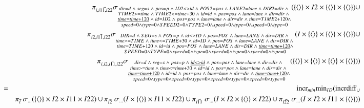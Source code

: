 \begin{eqnarray*}
&& \pi_{\vec{i, i11, i22}}\sigma_{\substack{dir = d \;\wedge\; seg = s \;\wedge\; pos = p \;\wedge\; ID2 <> id \;\wedge\; POS2 = pos \;\wedge\; LANE2 = lane \;\wedge\; DIR2 = dir \;\wedge\; \\ TIME2 >= time \;\wedge\; TIME2 <= time + 30 \;\wedge\; id = id \;\wedge\; pos = pos \;\wedge\;  lane = lane \;\wedge\; dir =dir \;\wedge\; \\\underline {time = time + 120} \;\wedge\; id = ID2 \;\wedge\; pos = pos \;\wedge\;  lane = lane \;\wedge\; dir = dir \;\wedge\; time = TIME2 + 120 \wedge \\speed = 0 \wedge type = 0 \wedge SPEED2 = 0 \wedge TYPE2 = 0 \wedge  speed = 0 \wedge type = 0 \wedge speed = 0 \wedge type =0 }}( \{{\langle\rangle} \} \times I2 \times \{{\langle\rangle} \} \times \{{\langle\rangle} \} ) \cup \\
&& \pi_{\vec{i2, i11, i22}}\sigma_{\substack{DIR = d \;\wedge\; SEG = s \;\wedge\; POS = p \;\wedge\; id <> ID \;\wedge\; pos = POS \;\wedge\; lane = LANE \;\wedge\; dir = DIR \;\wedge\; \\ time >= TIME \;\wedge\; time <= TIME + 30 \;\wedge\; id = ID \;\wedge\; pos = POS \;\wedge\;  lane = LANE \;\wedge\; dir=DIR \;\wedge\; \\time = TIME + 120 \;\wedge\; id = id \;\wedge\; pos = POS \;\wedge\;  lane = LANE \;\wedge\; dir = DIR \;\wedge\; \underline { time = time + 120} \wedge \\SPEED = 0 \wedge TYPE = 0 \wedge speed = 0 \wedge type = 0 \wedge  speed = 0 \wedge type = 0 \wedge speed = 0 \wedge type =0 }}(I \times \{{\langle\rangle} \} \times \{{\langle\rangle} \} \times  \{{\langle\rangle} \}) \cup \\
&& \pi_{\vec{i, i2, i11, i22}}\sigma_{\substack{dir = d \;\wedge\; seg = s \;\wedge\; pos = p \;\wedge\; \underline {id <> id} \;\wedge\; pos= pos \;\wedge\; lane = lane \;\wedge\; dir = dir \;\wedge\; \\ time >= time \;\wedge\; time <= time + 30 \;\wedge\; id = id \;\wedge\; pos = pos \;\wedge\;  lane = lane \;\wedge\; dir=dir \;\wedge\; \\\underline {time = time + 120} \;\wedge\; id = id \;\wedge\; pos = pos \;\wedge\;  lane = lane \;\wedge\; dir = dir \;\wedge\; \underline {time = time + 120} \wedge \\speed = 0 \wedge type = 0 \wedge speed = 0 \wedge type = 0 \wedge  speed = 0 \wedge type = 0 \wedge speed = 0 \wedge type =0 }}( \{{\langle\rangle} \} \times \{{\langle\rangle} \} \times \{{\langle\rangle} \} \times \{{\langle\rangle} \} )) \\
&=& \mathrm{incr}_{min} \mathrm{min}_{ID} (\mathrm{incrdiff}_{\cup} \\
&& \pi_{\vec{i}} \;\sigma_{\dots}(  \{{\langle\rangle} \} \times I2 \times I11 \times I22) \cup 
\pi_{\vec{i2}} \;\sigma_{\dots}(I \times \{{\langle\rangle} \} \times I11 \times I22) \cup 
\pi_{\vec{i11}} \;\sigma_{\dots}(I \times  I2 \times  \{{\langle\rangle} \} \times I22) \cup 
\pi_{\vec{i22}} \;\sigma_{ \dots}(I \times I2 \times I11 \times \{{\langle\rangle} \} ) )\\
\end{eqnarray*}
